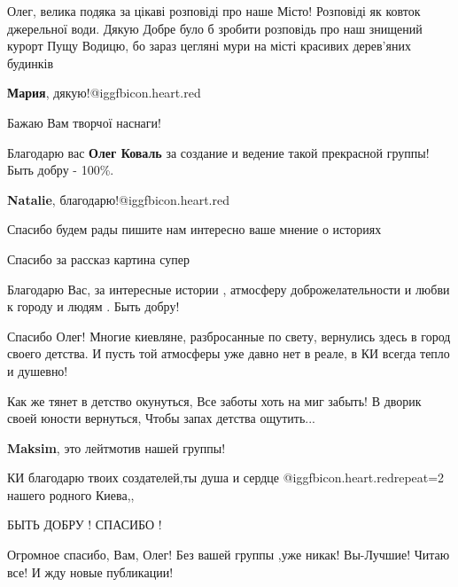 \begin{itemize}
Олег, велика подяка за цікаві розповіді про наше Місто! Розповіді як ковток
джерельної води. Дякую Добре було б зробити розповідь про наш знищений курорт
Пущу Водицю, бо зараз цегляні мури на місті красивих дерев'яних будинків

\begin{itemize} %
\textbf{Мария}, дякую!@igg{fbicon.heart.red}
\end{itemize} %

Бажаю Вам творчої наснаги!

Благодарю вас \textbf{Олег Коваль} за создание и ведение такой прекрасной группы!
Быть добру - 100\%.

\begin{itemize} %
\textbf{Natalie}, благодарю!@igg{fbicon.heart.red}
\end{itemize} %

Спасибо будем рады пишите нам интересно ваше мнение о историях

Спасибо за рассказ картина супер

Благодарю Вас, за интересные истории , атмосферу доброжелательности и любви к городу и людям .
Быть добру!


Спасибо Олег! Многие киевляне, разбросанные по свету, вернулись здесь в город
своего детства. И пусть той атмосферы уже давно нет в реале, в КИ всегда тепло
и душевно!



\obeycr
Как же тянет в детство окунуться,
Все заботы хоть на миг забыть!
В дворик своей юности вернуться,
Чтобы запах детства ощутить...
\restorecr

\begin{itemize} %
\textbf{Maksim}, это лейтмотив нашей группы!
\end{itemize} %

КИ благодарю твоих создателей,ты душа и сердце @igg{fbicon.heart.red}{repeat=2}
нашего родного Киева,,

 БЫТЬ ДОБРУ !  СПАСИБО !

 Огромное спасибо, Вам, Олег! Без вашей группы ,уже
никак! Вы-Лучшие! Читаю все! И жду новые публикации!



\end{itemize}
